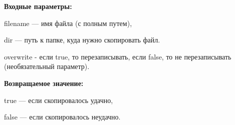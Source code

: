 \textbf{Входные параметры:}

filename --- имя файла (с полным путем),
 
dir --- путь к папке, куда нужно скопировать файл.

overwrite - если true, то перезаписывать, если false, то не перезаписывать (необязательный параметр).

\textbf{Возвращаемое значение:}

true --- если скопировалось удачно,
 
false --- если скопировалось неудачно.